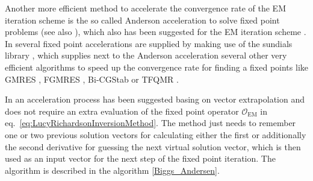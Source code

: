 Another more efficient method to accelerate the convergence rate of the EM iteration scheme is the so called Anderson acceleration \cite{Anderson1965} to solve fixed point problems (see also \cite{Walker2011,Toth2015}), which also has been suggested for the EM iteration scheme \cite{Henderson2019}. In \SASfit several fixed point accelerations are supplied by making use of the sundials library \cite{Hindmarsh2005}, which supplies next to the Anderson acceleration several other very efficient algorithms to speed up the convergence rate for finding a fixed points like GMRES \cite{Saad1986}, FGMRES \cite{Saad1993}, Bi-CGStab \cite{Vorst1992} or TFQMR \cite{Freund1993}.

In \cite{Biggs1997, Biggs1995} an acceleration process has been suggested basing on vector extrapolation and does not require an extra evaluation of the fixed point operator $\mathcal{O}_\mathrm{EM}$ in eq.\ \ref{eq:LucyRichardsonInversionMethod}. The method just needs to remember one or two previous solution vectors for calculating either the first or additionally the second derivative for guessing the next virtual solution vector, which is then used as an input vector for the next step of the fixed point iteration. The algorithm is described in the algorithm \ref{Biggs_Andersen}.
